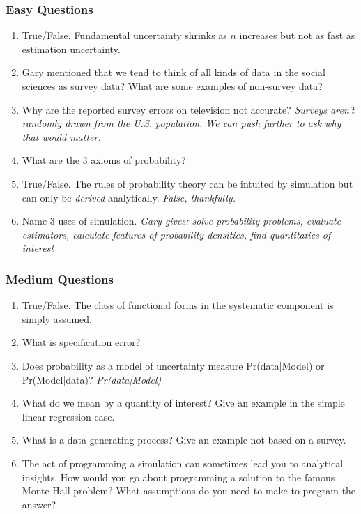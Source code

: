 \documentclass[11pt]{article}
\begin{document}
\subsubsection{Easy Questions}

\begin{enumerate}
\item True/False. Fundamental uncertainty shrinks as $n$ increases but not as fast as estimation uncertainty.
\item Gary mentioned that we tend to think of all kinds of data in the social sciences as survey data?  What are some examples of non-survey data?
\item Why are the reported survey errors on television not accurate? \textit{Surveys aren't randomly drawn from the U.S. population.  We can push further to ask why that would matter.}
\item What are the 3 axioms of probability?
\item True/False. The rules of probability theory can be intuited by simulation but can only be \textit{derived} analytically. \textit{False, thankfully.}
\item Name 3 uses of simulation. \textit{Gary gives: solve probability problems, evaluate estimators, calculate features of probability densities, find quantitaties of interest}

\end{enumerate}

\subsubsection{Medium Questions}

\begin{enumerate}
\item True/False.  The class of functional forms in the systematic component is simply assumed.
\item What is specification error?
\item Does probability as a model of uncertainty measure Pr(data|Model) or Pr(Model|data)? \textit{Pr(data|Model)}
\item What do we mean by a quantity of interest?  Give an example in the simple linear regression case.
\item What is a data generating process?  Give an example not based on a survey.
\item The act of programming a simulation can sometimes lead you to analytical insights.  How would you go about programming a solution to the famous Monte Hall problem?  What assumptions do you need to make to program the answer?
\end{enumerate}
\end{document}
